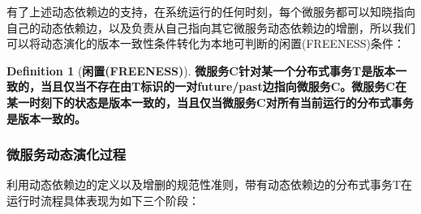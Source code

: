 \documentclass[a4paper, 12pt]{article}
\theoremstyle{definition}
\newtheorem{definition}{Definition}[section]
\begin{document}
有了上述动态依赖边的支持，在系统运行的任何时刻，每个微服务都可以知晓指向自己的动态依赖边，以及负责从自己指向其它微服务动态依赖边的增删，所以我们可以将动态演化的版本一致性条件转化为本地可判断的闲置(FREENESS)条件：

\begin{definition}[\textbf{闲置(FREENESS)}]
\label{definition:freeness}
\textbf{微服务C针对某一个分布式事务T是版本一致的，当且仅当不存在由T标识的一对future/past边指向微服务C。微服务C在某一时刻下的状态是版本一致的，当且仅当微服务C对所有当前运行的分布式事务是版本一致的。}
\end{definition}


\subsubsection{微服务动态演化过程}
利用动态依赖边的定义以及增删的规范性准则，带有动态依赖边的分布式事务T在运行时流程具体表现为如下三个阶段：
\end{document}
